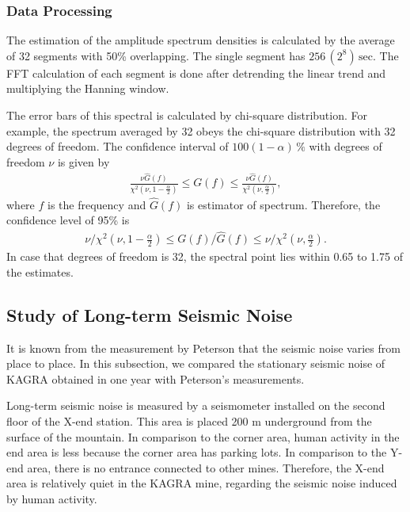 \subsubsection{Data Processing}
The estimation of the amplitude spectrum densities is calculated by the average of 32 segments with 50\% overlapping. The single segment has $256\, (2^8)\,\mathrm{sec}$. The FFT calculation of each segment is done after detrending the linear trend and multiplying the Hanning window. 

The error bars of this spectral is calculated by chi-square distribution. For example, the spectrum averaged by 32 obeys the chi-square distribution with 32 degrees of freedom. The confidence interval of $100(1-\alpha)\,\%$ with degrees of freedom $\nu$ is given by 
\begin{eqnarray}
  \frac{\nu{\hat{G}(f)}}{\chi^2(\nu,1-\frac{\alpha}{2})} \leq G(f) \leq \frac{\nu{\hat{G}(f)}}{\chi^2(\nu,\frac{\alpha}{2})},
\end{eqnarray}
where $f$ is the frequency and $\hat{G}(f)$ is estimator of spectrum. Therefore, the confidence level of 95\% is 
\begin{eqnarray}
  \nu/\chi^2(\nu,1-\frac{\alpha}{2}) \leq G(f)/\hat{G}(f) \leq \nu/\chi^2(\nu,\frac{\alpha}{2}).
\end{eqnarray}
In case that degrees of freedom is 32, the spectral point lies within 0.65 to 1.75 of the estimates.

\subsection{Study of Long-term Seismic Noise} \label{sec:332}
It is known from the measurement by Peterson that the seismic noise varies from place to place.  In this subsection, we compared the stationary seismic noise of KAGRA obtained in one year with Peterson's measurements. 

Long-term seismic noise is measured by a seismometer installed on the second floor of the X-end station. This area is placed 200 $\mathrm{m}$ underground from the surface of the mountain. In comparison to the corner area, human activity in the end area is less because the corner area has parking lots. In comparison to the Y-end area, there is no entrance connected to other mines. Therefore, the X-end area is relatively quiet in the KAGRA mine, regarding the seismic noise induced by human activity. 

